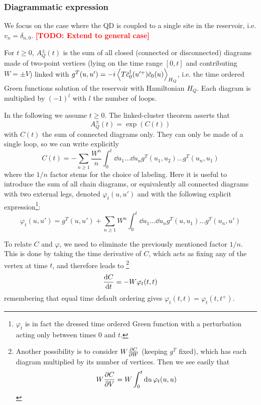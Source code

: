 \documentclass[12pt]{article}
\newcommand\TODO[1]{\textcolor{red}{\textbf{[TODO: #1]}}}
\begin{document}
\subsubsection{Diagrammatic expression}

We focus on the case where the \ac{QD} is coupled to a single site in the reservoir, i.e. $v_n = \delta_{n,0}$.
\TODO{Extend to general case}

For $t \ge 0$, $A^{\pm}_Q(t)$ is the sum of all closed (connected or disconnected) diagrams made of two-point vertices (lying on the time range $[0, t]$ and contributing $W=\pm V$) linked with $g^T(u, u') = -i\expval{T \tilde c_0^\dag(u'^+) \tilde c_0(u)}_{H_Q}$, i.e. the time ordered Green functions solution of the reservoir with Hamiltonian $H_Q$. Each diagram is multiplied by $(-1)^{l}$ with $l$ the number of loops.

In the following we assume $t \ge 0$.
The linked-cluster theorem asserts that
\begin{equation}
	A^{\pm}_Q(t) = \exp(C(t))
\end{equation}
with $C(t)$ the sum of connected diagrams only. They can only be made of a single loop, so we can write explicitly
\begin{equation}
	C(t) = - \sum_{n \ge 1} \frac{W^n}{n} \int_0^t \dd{u_1} \ldots \dd{u_n} g^T(u_1, u_2) \ldots g^T(u_n, u_1)
\end{equation}
where the $1/n$ factor stems for the choice of labeling.
Here it is useful to introduce the sum of all chain diagrams, or equivalently all connected diagrams with two external legs, denoted $\varphi_t(u, u')$ and with the following explicit expression\footnote{$\varphi_t$ is in fact the dressed time ordered Green function with a perturbation acting only between times $0$ and $t$.}:
\begin{equation}
	\varphi_t(u, u') = g^T(u, u') + \sum_{n \ge 1} W^n \int_0^t \dd{u_1} \ldots \dd{u_n} g^T(u, u_1) \ldots g^T(u_n, u')
\end{equation}

To relate $C$ and $\varphi$, we need to eliminate the previously mentioned factor $1/n$. 
This is done by taking the time derivative of $C$, which acts as fixing any of the vertex at time $t$, and therefore leads to%
\footnote{
Another possibility is to consider $W \pdv{C}{W}$ (keeping $g^T$ fixed), which has each diagram multiplied by its number of vertices. Then we see easily that
\begin{equation}
	W \pdv{C}{V} = W \int_0^t \dd{u} \varphi_t(u, u)
\end{equation}
}
\begin{equation}
	\dv{C}{t} = -W \varphi_t(t, t)
\end{equation}
remembering that equal time default ordering gives $\varphi_t(t, t) = \varphi_t(t, t^+)$.
\end{document}
